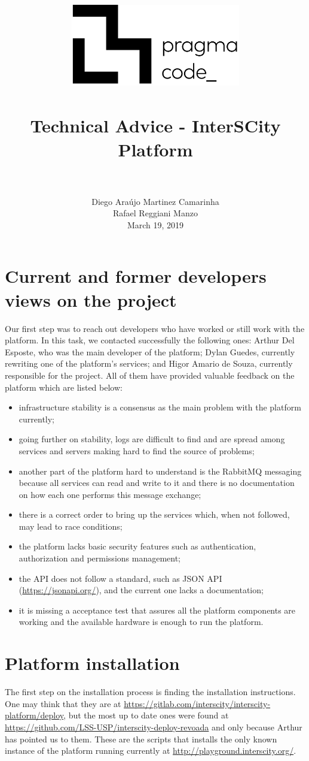 \documentclass[paper=a4, fontsize=11pt]{scrartcl}
\title{
  \usefont{OT1}{bch}{b}{n}
  \normalfont \normalsize \includegraphics[width=10em]{pc_h_preto} \\ [25pt]
  \horrule{0.5pt} \\[0.4cm]
  \huge Technical Advice - InterSCity Platform \\
  \horrule{2pt} \\[0.5cm]
}
\author{
  \normalfont \normalsize
  Diego Araújo Martinez Camarinha\\[-3pt]    \normalsize
  Rafael Reggiani Manzo\\[-3pt]    \normalsize
  March 19, 2019
}
\date{}
\numberwithin{equation}{section}    %
\numberwithin{figure}{section}      %
\numberwithin{table}{section}        %
\begin{document}
\maketitle

\section{Current and former developers views on the project}
  Our first step was to reach out developers who have worked or still work with the platform. In this task, we contacted successfully the following ones: Arthur Del Esposte, who was the main developer of the platform; Dylan Guedes, currently rewriting one of the platform's services; and Higor Amario de Souza, currently responsible for the project. All of them have provided valuable feedback on the platform which are listed below:

  \begin{itemize}
    \item infrastructure stability is a consensus as the main problem with the platform currently;
    \item going further on stability, logs are difficult to find and are spread among services and servers making hard to find the source of problems;
    \item another part of the platform hard to understand is the RabbitMQ messaging because all services can read and write to it and there is no documentation on how each one performs this message exchange;
    \item there is a correct order to bring up the services which, when not followed, may lead to race conditions;
    \item the platform lacks basic security features such as authentication, authorization and permissions management;
    \item the API does not follow a standard, such as JSON API (\url{https://jsonapi.org/}), and the current one lacks a documentation;
    \item it is missing a acceptance test that assures all the platform components are working and the available hardware is enough to run the platform.
  \end{itemize}

\section{Platform installation}
  The first step on the installation process is finding the installation instructions. One may think that they are at \url{https://gitlab.com/interscity/interscity-platform/deploy}, but the most up to date ones were found at \url{https://github.com/LSS-USP/interscity-deploy-revoada} and only because Arthur has pointed us to them. These are the scripts that installs the only known instance of the platform running currently at \url{http://playground.interscity.org/}.
\end{document}
